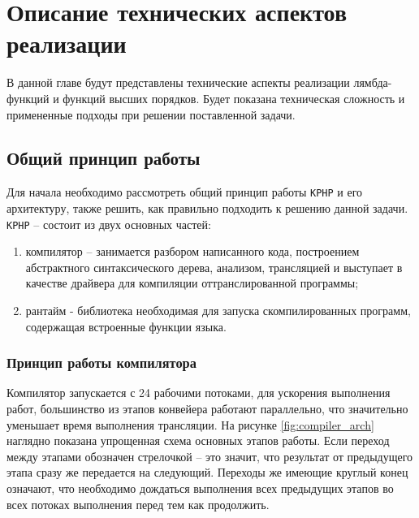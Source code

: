 
\chapter{Описание технических аспектов реализации}
В данной главе будут представлены технические аспекты реализации лямбда-функций и функций высших порядков.
Будет показана техническая сложность и примененные подходы при решении поставленной задачи.

\section{Общий принцип работы}
Для начала необходимо рассмотреть общий принцип работы \verb|KPHP| и его архитектуру, также решить, как правильно подходить к решению данной задачи.
\verb|KPHP| -- состоит из двух основных частей:
\begin{enumerate}
\item компилятор -- занимается разбором написанного кода, построением абстрактного синтаксического дерева, анализом, трансляцией и выступает в качестве драйвера для компиляции оттранслированной программы;
\item рантайм - библиотека необходимая для запуска скомпилированных программ, содержащая встроенные функции языка.
\end{enumerate}

\subsection{Принцип работы компилятора}
Компилятор запускается с 24 рабочими потоками, для ускорения выполнения работ, большинство из этапов конвейера работают параллельно, что значительно уменьшает время выполнения трансляции.
На рисунке \ref{fig:compiler_arch} наглядно показана упрощенная схема основных этапов работы.
Если переход между этапами обозначен стрелочкой -- это значит, что результат от предыдущего этапа сразу же передается на следующий.
Переходы же имеющие круглый конец означают, что необходимо дождаться выполнения всех предыдущих этапов во всех потоках выполнения перед тем как продолжить.

